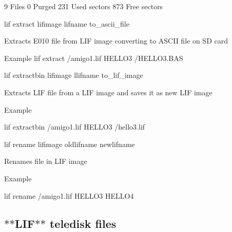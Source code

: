 \begin{DoxyItemize}
\begin{DoxyPre}             9 Files
             0 Purged
           231 Used sectors
           873 Free sectors
      \end{DoxyPre}

\item lif extract lifimage lifname to\+\_\+ascii\+\_\+file
\begin{DoxyItemize}
\item Extracts E010 file from L\+IF image converting to A\+S\+C\+II file on SD card
\item Example lif extract /amigo1.lif H\+E\+L\+L\+O3 /\+H\+E\+L\+L\+O3.B\+AS
\end{DoxyItemize}
\item lif extractbin lifimage llifname to\+\_\+lif\+\_\+image
\begin{DoxyItemize}
\item Extracts L\+IF file from a L\+IF image and saves it as new L\+IF image
\item Example
\begin{DoxyItemize}
\item lif extractbin /amigo1.lif H\+E\+L\+L\+O3 /hello3.lif
\end{DoxyItemize}
\end{DoxyItemize}
\item lif rename lifimage oldlifname newlifname
\begin{DoxyItemize}
\item Renames file in L\+IF image
\item Example
\begin{DoxyItemize}
\item lif rename /amigo1.lif H\+E\+L\+L\+O3 H\+E\+L\+L\+O4
\end{DoxyItemize}
\end{DoxyItemize}
\end{DoxyItemize}





\subsection*{$\ast$$\ast$\+L\+I\+F$\ast$$\ast$ teledisk files}


